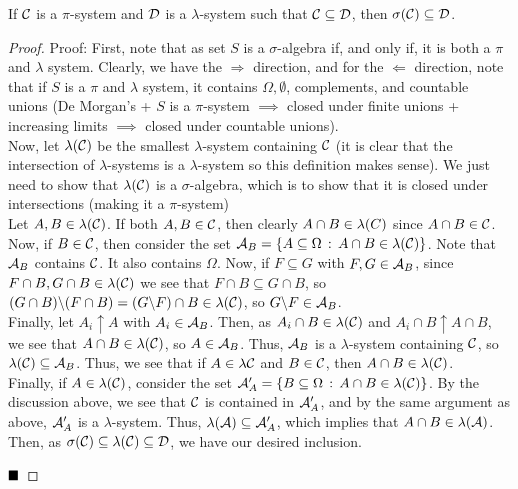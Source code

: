 
\begin{theorem}
    If $\cal{C}$ is a $\pi$-system and $\cal{D}$ is a $\lambda$-system such that $\cal{C} \subseteq \cal{D}$, then $\sigma(\cal{C}) \subseteq \cal{D}$. 
\end{theorem}
\begin{proof}{Proof:}
    First, note that as set $S$ is a $\sigma$-algebra if, and only if, it is both a $\pi$ and $\lambda$ system. Clearly, we have the $\Rightarrow$ direction, and for the $\Leftarrow$ direction, note that if $S$ is a $\pi$ and $\lambda$ system, it contains $\Omega, \emptyset$, complements, and countable unions (De Morgan's + $S$ is a $\pi$-system $\implies$ closed under finite unions + increasing limits $\implies$ closed under countable unions).\\
    
    Now, let $\lambda(\cal{C})$ be the smallest $\lambda$-system containing $\cal{C}$ (it is clear that the intersection of $\lambda$-systems is a $\lambda$-system so this definition makes sense). We just need to show that $\lambda(\cal{C})$ is a $\sigma$-algebra, which is to show that it is closed under intersections (making it a $\pi$-system)\\
    
    Let $A, B \in \lambda(\cal{C})$. If both $A, B \in \cal{C}$, then clearly $A \cap B \in \lambda{\cal(C)}$ since $A \cap B \in \cal{C}$. Now, if $B \in \cal{C}$, then consider the set $\cal{A}_{B} = \{A \subseteq \Omega \col A \cap B \in \lambda(\cal{C})\}$. Note that $\cal{A}_{B}$ contains $\cal{C}$. It also contains $\Omega$. Now, if $F \subseteq G$ with $F, G \in \cal{A}_{B}$, since $F \cap B, G \cap B \in \lambda(\cal{C})$ we see that $F \cap B \subseteq G \cap B$, so $(G \cap B) \backslash (F \cap B) = (G \backslash F) \cap B \in \lambda(\cal{C})$, so $G \backslash F \in \cal{A}_{B}$.\\

    Finally, let $A_i \uparrow A$ with $A_i \in \cal{A}_{B}$. Then, as $A_i \cap B \in \lambda(\cal{C})$ and $A_i \cap B \uparrow A \cap B$, we see that $A \cap B \in \lambda(\cal{C})$, so $A \in \cal{A}_{B}$. Thus, $\cal{A}_{B}$ is a $\lambda$-system containing $\cal{C}$, so $\lambda(\cal{C}) \subseteq \cal{A}_{B}$. Thus, we see that if $A \in \lambda{\cal{C}}$ and $B \in \cal{C}$, then $A \cap B \in \lambda(\cal{C})$. \\
    
    Finally, if $A \in \lambda(\cal{C})$, consider the set $\cal{A}_{A}' = \{B \subseteq \Omega \col A \cap B \in \lambda(\cal{C})\}$. By the discussion above, we see that $\cal{C}$ is contained in $\cal{A}_{A}'$, and by the same argument as above, $\cal{A}_{A}'$ is a $\lambda$-system. Thus, $\lambda(\cal{A}) \subseteq \cal{A}_{A}'$, which implies that $A \cap B \in \lambda(\cal{A})$.\\

    Then, as $\sigma(\cal{C}) \subseteq \lambda(\cal{C}) \subseteq \cal{D}$, we have our desired inclusion.

    $\qed$
\end{proof}
